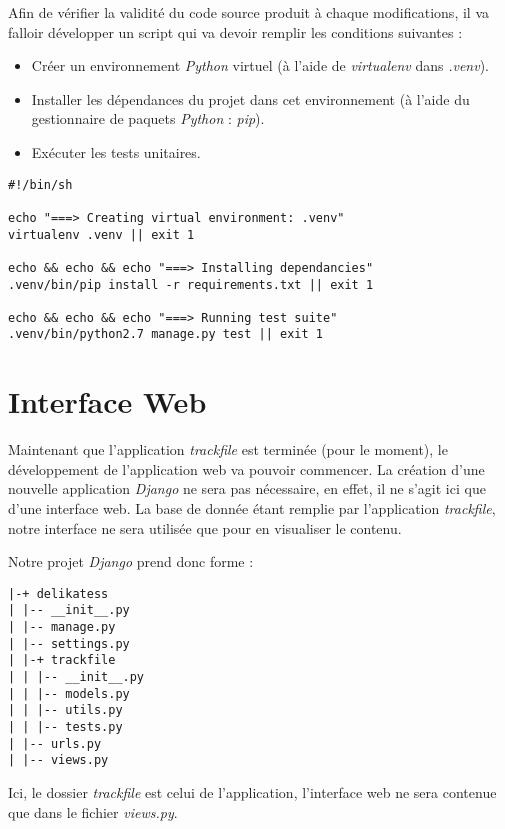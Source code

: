 Afin de vérifier la validité du code source produit à chaque modifications, il va falloir développer
un script qui va devoir remplir les conditions suivantes :

\begin{itemize}
     \item Créer un environnement \textit{Python} virtuel (à l'aide de \textit{virtualenv} dans \textit{.venv}).
     \item Installer les dépendances du projet dans cet environnement (à l'aide du gestionnaire de paquets \textit{Python} : \textit{pip}).
     \item Exécuter les tests unitaires.
\end{itemize}

\begin{verbatim}
#!/bin/sh

echo "===> Creating virtual environment: .venv"
virtualenv .venv || exit 1

echo && echo && echo "===> Installing dependancies"
.venv/bin/pip install -r requirements.txt || exit 1

echo && echo && echo "===> Running test suite"
.venv/bin/python2.7 manage.py test || exit 1
\end{verbatim}

\section{Interface Web}

Maintenant que l'application \textit{trackfile} est terminée (pour le moment), le développement de l'application web
va pouvoir commencer. La création d'une nouvelle application \textit{Django} ne sera pas nécessaire, en effet, il ne
s'agit ici que d'une interface web. La base de donnée étant remplie par l'application \textit{trackfile}, notre interface
ne sera utilisée que pour en visualiser le contenu.

Notre projet \textit{Django} prend donc forme :

\begin{verbatim}
|-+ delikatess
| |-- __init__.py
| |-- manage.py
| |-- settings.py
| |-+ trackfile
| | |-- __init__.py
| | |-- models.py
| | |-- utils.py
| | |-- tests.py
| |-- urls.py
| |-- views.py
\end{verbatim}

Ici, le dossier \textit{trackfile} est celui de l'application, l'interface web ne sera contenue que dans le fichier
\textit{views.py}.
